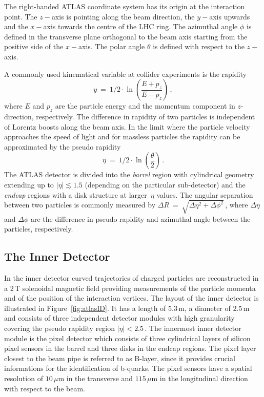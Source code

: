 The right-handed ATLAS coordinate system has its origin at the interaction point. The $z-$axis is pointing along the
beam direction, the $y-$axis  upwards and the $x-$axis towards the centre of the LHC ring. 
The azimuthal angle $\phi$ is defined in the transverse plane orthogonal
to the beam axis starting from the positive side of the $x-$axis. The polar angle $\theta$ is  defined with respect to the $z-$axis.

A commonly used kinematical variable at  collider experiments  is the rapidity
\begin{equation}
y ~ = ~ 1/2 \cdot \ln \left( \frac{E + p_{z}}{E - p_z} \right) \,, 
\end{equation}
where $E$ and $ p_z$ are the particle energy and the momentum component in  $z$-direction, respectively.
The difference in  rapidity of two particles is independent of Lorentz boosts along the beam axis. 
In the limit where the particle velocity approaches  the speed of light and
 for massless particles the rapidity can be approximated by the pseudo rapidity
\begin{equation}
\eta ~ = ~ 1/2 \cdot \ln \left( \frac{\theta}{2} \right)\,. 
\end{equation}
The ATLAS detector is divided into the \emph{barrel} region with  cylindrical geometry
extending up to $|\eta| \apprle 1.5$ (depending on the particular  sub-detector) 
and the \emph{endcap} regions with a disk structure at larger~$\eta$ values. The angular separation between 
two particles is commonly measured by
 $\Delta R ~=~\sqrt{\Delta \eta^2 + \Delta \phi^2}\,$, where $\Delta\eta$ and $\Delta\phi$ are the difference in pseudo rapidity
and azimuthal angle between the particles, respectively.

\subsection{The Inner Detector}


In the inner detector  curved trajectories of charged particles are reconstructed in a 2\,T solenoidal magnetic field
providing measurements of the particle momenta and of  the position of the interaction vertices. 
The layout of the inner detector is illustrated in Figure~\ref{fig:atlasID}.
It has a  length of $5.3\,$m, a diameter of $2.5\,$m and consists
 of three independent detector modules with high granularity
covering the pseudo rapidity region $|\eta| < 2.5\,.$ The innermost inner detector module is the pixel detector
which consists of three cylindrical layers of silicon pixel sensors in the barrel and three disks in the endcap regions. 
The pixel layer closest to the beam pipe is
referred to as B-layer, since it provides crucial informations for the identification of b-quarks. 
The pixel sensors have a spatial resolution of  $10\,\mu$m in the transverse and $115\,\mu$m in the longitudinal
direction with respect to the beam.

